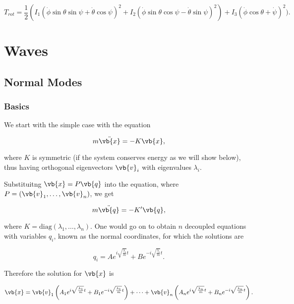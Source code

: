 \documentclass[a4paper,12pt]{report}
\begin{document}
\begin{equation}
	T_{rot} = \frac{1}{2} (I_1(\dot{\phi } \sin \theta \sin \psi + \dot{\theta } \cos \psi )^2 + I_2(\dot{\phi } \sin \theta \cos \psi -\dot{\theta } \sin \psi )^2) + I_3(\dot{\phi } \cos \theta + \dot{\psi } )^2).
\end{equation}


\chapter{Waves}

\section{Normal Modes}

\subsection{Basics}

We start with the simple case with the equation

\begin{equation}
    m \ddot{\vb{x} } = -K\vb{x}, \label{normal} 
\end{equation}

where \(K\) is symmetric (if the system conserves energy as we will show below), thus having orthogonal eigenvectors \(\vb{v} _{i} \) with eigenvalues \(\lambda _{i} \).

Substituitng \(\vb{x} = P \vb{q} \) into the equation, where \(P = (\vb{v} _{1},\ldots ,\vb{v} _{n}   )\), we get

\begin{equation}
    m \ddot{\vb{q} } = -K'\vb{q},
\end{equation}

where \(K = \text{diag}(\lambda _{1}, \ldots , \lambda _{n})\). One would go on to obtain \(n\) decoupled equations with variables \(q_{i}\), known as the normal coordinates, for which the solutions are 

\begin{equation}
	q_{i} = Ae^{i\sqrt{\frac{\lambda _{i} }{m} } t} + Be^{-i\sqrt{\frac{\lambda _{i} }{m} } t}.  
\end{equation}

Therefore the solution for \(\vb{x} \) is

\begin{equation}
	\vb{x} = \vb{v} _{1}\left(A_1 e^{i\sqrt{\frac{\lambda _{1} }{m} } t} + B_1 e^{-i\sqrt{\frac{\lambda _{1} }{m} } t}\right) + \cdots + \vb{v} _{n} \left(A_{n} e^{i\sqrt{\frac{\lambda _{n} }{m} } t} + B_{n} e^{-i\sqrt{\frac{\lambda _{n} }{m} } t}\right).
\end{equation}
\end{document}
